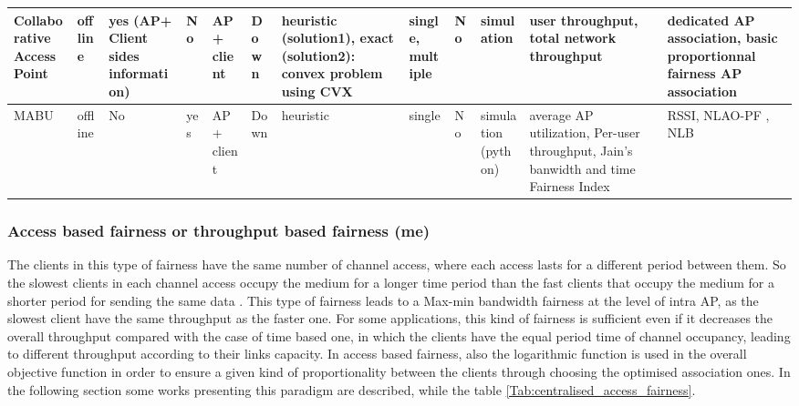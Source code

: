 \documentclass[journal,transmag]{IEEEtran}
\begin{document}
\begin{table}
\begin{tabular} {|p{1.0cm}|p{.7cm}|p{1.2cm}|p{.7cm}|p{1.1cm}|p{.95cm}|p{}|p{.7cm}|p{.7cm} |p{1.75cm}|p{}|p{}|}
\scriptsize{Collaborative Access Point \cite{14optimalAP_INFOCOM}} &\scriptsize{offline} &\scriptsize{yes (AP+ Client sides information)} &\scriptsize{No} &\scriptsize{AP+ client} &\scriptsize{Down} &\scriptsize{heuristic (solution1), exact (solution2): convex problem using CVX} &\scriptsize{single, multiple} &\scriptsize{No} &\scriptsize{simulation} &\scriptsize{user throughput, total network throughput} &\scriptsize{dedicated AP association, basic proportionnal fairness AP association} \\\hline

\scriptsize{MABU \cite{15Demand_aware_load_balance_WLAN,16throughput_optimisation_association_bandwidth}} &\scriptsize{offline} &\scriptsize{No} &\scriptsize{yes} &\scriptsize{AP+ client} &\scriptsize{Down} &\scriptsize{heuristic} &\scriptsize{single} &\scriptsize{No} &\scriptsize{simulation (python)} &\scriptsize{average AP utilization, Per-user throughput, Jain’s banwidth and time Fairness Index} &\scriptsize{RSSI, NLAO-PF \cite{14AP_association_multirate_WLAN}, NLB \cite{13smartAssoc}}\\\hline

\end{tabular}
\end{table} 



\subsubsection{Access based fairness or throughput based fairness (me)}
The clients in this type of fairness have the same number of channel access, where each access lasts for a different period between them. So the slowest clients in each channel access occupy the medium for a longer time period than the fast clients that occupy the medium for a shorter period for sending the same data \cite{08proportional_fairness_multiRate_LAN}. This type of fairness leads to a Max-min bandwidth fairness at the level of intra AP, as the slowest client have the same throughput as the faster one. For some applications, this kind of fairness is sufficient even if it decreases the overall throughput compared with the case of time based one, in which the clients have the equal period time of channel occupancy, leading to different throughput according to their links capacity. In access based fairness, also the logarithmic function is used in the overall objective function in order to ensure a given kind of proportionality between the clients through choosing the optimised association ones. In the following section some works presenting this paradigm are described, while the table \ref{Tab:centralised_access_fairness}.    
\end{document}
